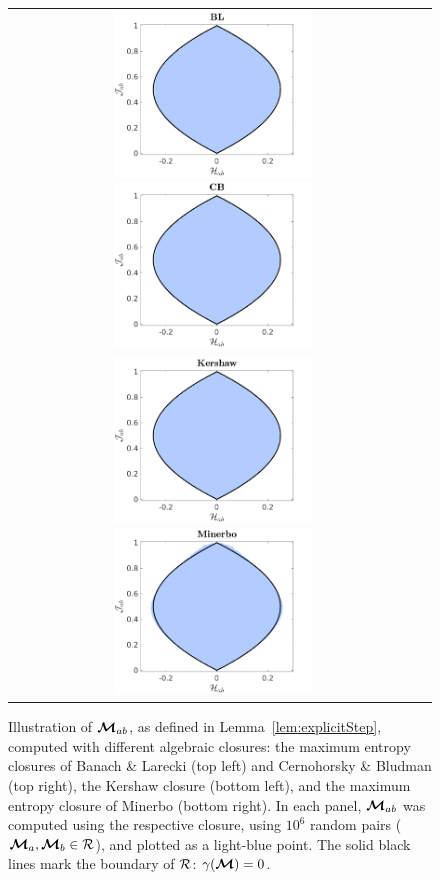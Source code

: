 \begin{figure}[h]
  \centering
  \begin{tabular}{cc}
    \includegraphics[width=0.5\textwidth]{figures/MabWithBLME}
    \includegraphics[width=0.5\textwidth]{figures/MabWithCBME} \\
    \includegraphics[width=0.5\textwidth]{figures/MabWithBLKS}
    \includegraphics[width=0.5\textwidth]{figures/MabWithMI}
  \end{tabular}
   \caption{Illustration of $\boldsymbol{\mathcal{M}}_{ab}$, as defined in Lemma~\ref{lem:explicitStep}, computed with different algebraic closures: the maximum entropy closures of Banach \& Larecki (top left) and Cernohorsky \& Bludman (top right), the Kershaw closure (bottom left), and the maximum entropy closure of Minerbo (bottom right).  In each panel, $\boldsymbol{\mathcal{M}}_{ab}$ was computed using the respective closure, using $10^{6}$ random pairs ($\boldsymbol{\mathcal{M}}_{a},\boldsymbol{\mathcal{M}}_{b}\in\mathcal{R}$), and plotted as a light-blue point.  The solid black lines mark the boundary of $\mathcal{R}$: $\gamma(\boldsymbol{\mathcal{M}}) = 0$.}
  \label{fig:MabWithDifferentClosure}
\end{figure}